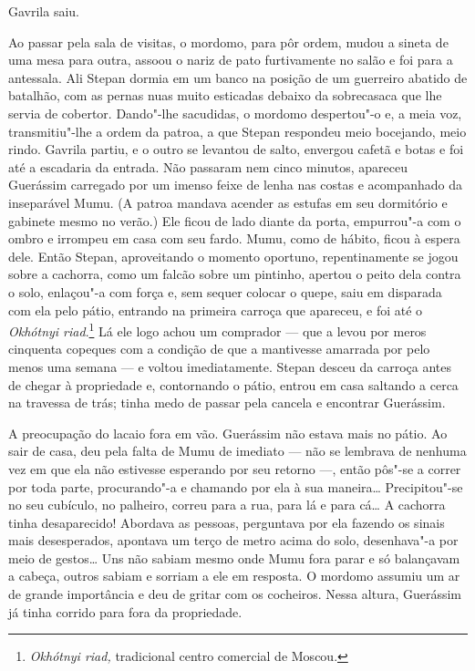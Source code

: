 Gavrila saiu.

Ao passar pela sala de visitas, o mordomo, para pôr ordem, mudou a
sineta de uma mesa para outra, assoou o nariz de pato furtivamente no
salão e foi para a antessala. Ali Stepan dormia em um banco na posição
de um guerreiro abatido de batalhão, com as pernas nuas muito esticadas
debaixo da sobrecasaca que lhe servia de cobertor. Dando"-lhe sacudidas,
o mordomo despertou"-o e, a meia voz, transmitiu"-lhe a ordem da patroa, a
que Stepan respondeu meio bocejando, meio rindo. Gavrila partiu, e o
outro se levantou de salto, envergou cafetã e botas e foi até a escadaria da entrada. Não passaram nem cinco minutos, apareceu
Guerássim carregado por um imenso feixe de lenha nas costas e acompanhado
da inseparável Mumu. (A patroa mandava acender as estufas em seu
dormitório e gabinete mesmo no verão.) Ele ficou de lado diante da
porta, empurrou"-a com o ombro e irrompeu em casa com seu fardo. Mumu,
como de hábito, ficou à espera dele. Então Stepan, aproveitando o
momento oportuno, repentinamente se jogou sobre a cachorra, como um
falcão sobre um pintinho, apertou o peito dela contra o solo, enlaçou"-a
com força e, sem sequer colocar o quepe, saiu em disparada com ela pelo
pátio, entrando na primeira carroça que apareceu, e foi até o
\emph{Okhótnyi riad}.\footnote{\emph{Okhótnyi riad,} tradicional
  centro comercial de Moscou.} Lá ele logo achou um comprador --- que a
levou por meros cinquenta copeques com a condição de que a mantivesse
amarrada por pelo menos uma semana --- e voltou imediatamente. Stepan
desceu da carroça antes de chegar à propriedade e, contornando o pátio,
entrou em casa saltando a cerca na travessa de trás; tinha medo de
passar pela cancela e encontrar Guerássim.

A preocupação do lacaio fora em vão. Guerássim não estava mais no pátio.
Ao sair de casa, deu pela falta de Mumu de imediato --- não se lembrava
de nenhuma vez em que ela não estivesse esperando por seu retorno ---,
então pôs"-se a correr por toda parte, procurando"-a e chamando por ela à
sua maneira\ldots{} Precipitou"-se no seu cubículo, no palheiro, correu para a
rua, para lá e para cá\ldots{} A cachorra tinha desaparecido! Abordava as pessoas,
perguntava por ela fazendo os sinais mais desesperados, apontava um
terço de metro acima do solo, desenhava"-a por meio de gestos\ldots{} Uns não
sabiam mesmo onde Mumu fora parar e só balançavam a cabeça, outros
sabiam e sorriam a ele em resposta. O mordomo assumiu um ar de grande
importância e deu de gritar com os cocheiros. Nessa altura, Guerássim
já tinha corrido para fora da propriedade.

